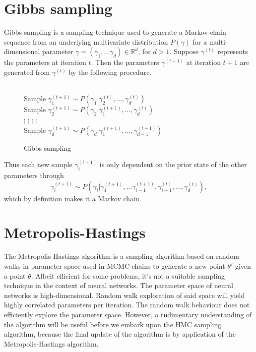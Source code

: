 \section{Gibbs sampling}
Gibbs sampling \cite{gibbs} is a sampling technique used to generate a Markov chain sequence from an underlying multivariate distribution $P(\gamma)$ for a multi-dimensional parameter $\gamma = (\gamma_1, \ldots \gamma_d) \in \mathbb{R}^d$, for $d > 1$.
Suppose $\gamma^{(t)}$ represents the parameters at iteration $t$. Then the parameters $\gamma^{(t+1)}$ at iteration $t+1$ are generated from $\gamma^{(t)}$ by the following procedure.
\begin{figure}[H]
  \begin{algorithm}[H]
    \caption{Gibbs sampling}
    \begin{algorithmic}
      \\
        \State Sample $\gamma^{(t+1)}_1 \sim P(\gamma_1|\gamma_2^{(t)},...,\gamma_d^{(t)})$ \\
        \State Sample $\gamma^{(t+1)}_2 \sim P(\gamma_2|\gamma_1^{(t+1)},...,\gamma_d^{(t)})$\\
        \State $\vdots$ \qquad  \qquad $\vdots$ \qquad  \qquad $\vdots$ \qquad \qquad $\vdots$\\
        \State Sample $\gamma^{(t+1)}_d \sim P(\gamma_d|\gamma_1^{(t+1)},...,\gamma_{d-1}^{(t+1)})$\\
      \EndProcedure
    \end{algorithmic}
  \end{algorithm}
\end{figure}
\noindent Thus each new sample $\gamma^{(t+1)}_i$ is only dependent on the prior state of the other parameters through
\begin{equation}
  \gamma_i^{(t+1)} \sim P(\gamma_i|\gamma_{1}^{(t+1)}, \ldots \gamma_{i-1}^{(t+1)}, \gamma_{i+1}^{(t)}, \ldots, \gamma_{d}^{(t)}),
\end{equation}
which by definition makes it a Markov chain.

\section{Metropolis-Hastings}
The Metropolis-Hastings algorithm \cite{metropolis} is a sampling algorithm based on random walks in parameter space used in MCMC chains to generate a new point $\theta'$ given a point $\theta$. Albeit efficient for some
problems, it's not a suitable sampling technique in the context of neural networks. 
The parameter space of neural networks is high-dimensional. Random walk exploration of said space will
yield highly correlated parameters per iteration. The random walk behaviour does not efficiently explore the parameter space.
However, a rudimentary understanding of the algorithm will be useful before we embark upon the HMC sampling algorithm, 
because the final update of the algorithm is by application of the Metropolis-Hastings algorithm.

